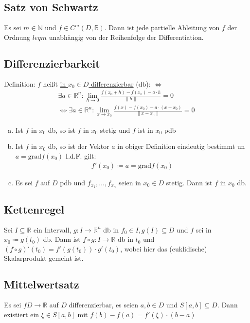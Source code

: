 \documentclass{article}
\begin{document}
\subsection{Satz von Schwartz}
\label{sec: Schwartz}
Es sei $m \in \mathbb{N}$ und $f \in C^m(D,\mathbb{R})$. Dann ist jede partielle Ableitung von $f$ der Ordnung $leq m$
unabhängig von der Reihenfolge der Differentiation.

\subsection{Differenzierbarkeit}
Definition: $f$ heißt \underline{in $x_0 \in D$ differenzierbar} (db): $\Leftrightarrow$
\begin{align*}
    \exists a \in \mathbb{R}^n: \lim \limits_{h \to 0} \frac{f(x_0+h) -f(x_0) - a\cdot h}{\lVert h \rVert} = 0 \\
    \Leftrightarrow \exists a \in \mathbb{R}^n : \lim \limits_{x \to x_0} \frac{f(x) -f(x_0) - a\cdot (x-x_0)}{\lVert x-x_0 \rVert} = 0
\end{align*}
\begin{enumerate}[a)]
    \item Ist $f$ in $x_0$ db, so ist $f$ in $x_0$ stetig und $f$ ist in $x_0$ pdb
    \item Ist $f$ in $x_0$ db, so ist der Vektor $a$ in obiger Definition eindeutig bestimmt un $a=\text{grad}f(x_0)$ I.d.F. gilt:
    \begin{align*}
        f'(x_0) \coloneqq a = \text{grad}f(x_0)
    \end{align*}
    \item Es sei $f$ auf $D$ pdb und $f_{x_1},\ldots,f_{x_n}$ seien in $x_0 \in D$ stetig. Dann ist $f$ in $x_0$ db.
\end{enumerate}

\subsection{Kettenregel}
Sei $I \subseteq \mathbb{R}$ ein Intervall, $g: I \to \mathbb{R}^n$ db in $f_0 \in I, g(I) \subseteq D$ und $f$ sei in $x_0 \coloneqq g(t_0)$ db. 
Dann ist $f \circ g: I \to \mathbb{R}$ db in $t_0$ und $(f \circ g)' (t_0) = f'(g(t_0)) \cdot g'(t_0)$, wobei hier das (euklidische) Skalarprodukt gemeint ist.

\subsection{Mittelwertsatz}
Es sei $f D \to \mathbb{R}$ auf $D$ differenzierbar, es seien $a,b \in D$ und $S[a,b] \subseteq D$. Dann existiert ein $\xi \in S[a,b]$ mit $f(b) - f(a) = f'(\xi) \cdot (b-a)$
\end{document}
